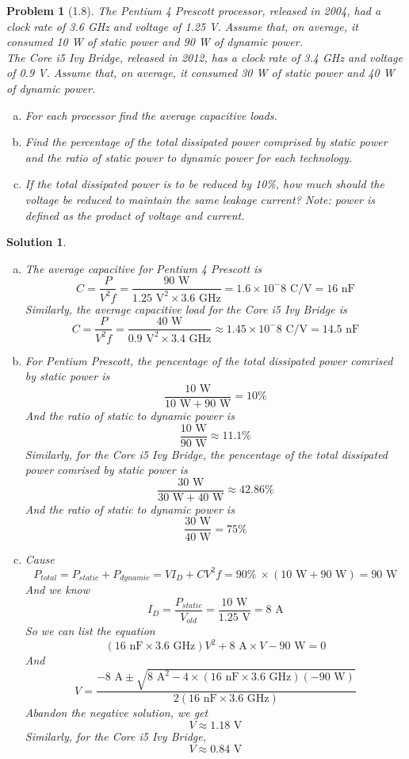\documentclass[12pt]{article}
\newtheorem{problem}{Problem}[]
\newtheorem*{solution}{Solution}
\begin{document}
    \begin{problem}[1.8]
      The Pentium 4 Prescott processor, released in 2004, had a clock rate of 3.6 GHz and voltage of 1.25 V. Assume that, on average, it consumed 10 W of static power and 90 W of dynamic power.\\
      The Core i5 Ivy Bridge, released in 2012, has a clock rate of 3.4 GHz and voltage of 0.9 V. Assume that, on average, it consumed 30 W of static power and 40 W of dynamic power.
      \begin{enumerate}[a.]
        \item For each processor find the average capacitive loads.
        \item Find the percentage of the total dissipated power comprised by static power and the ratio of static power to dynamic power for each technology.
        \item If the total dissipated power is to be reduced by 10\%, how much should the voltage be reduced to maintain the same leakage current? Note: power is defined as the product of voltage and current.
      \end{enumerate}
    \end{problem}

    \begin{solution}
      \begin{enumerate}[a.]
        \item The average capacitive for Pentium 4 Prescott is 
        \[C=\frac{P}{V^2f}=\frac{90\text{ W}}{1.25\text{ V}^2\times 3.6\text{ GHz}} = 1.6\times 10^-8\text{ C/V}=16\text{ nF}\]
        Similarly, the average capacitive load for the Core i5 Ivy Bridge is
        \[C=\frac{P}{V^2f}=\frac{40\text{ W}}{0.9\text{ V}^2\times 3.4\text{ GHz}}\approx 1.45\times 10^-8\text{ C/V}=14.5\text{ nF}\]
        \item For Pentium Prescott, the pencentage of the total dissipated power comrised by static power is
        \[\frac{10\text{ W}}{10\text{ W} + 90\text{ W}}=10\%\]
        And the ratio of static to dynamic power is
        \[\frac{10\text{ W}}{90\text{ W}}\approx 11.1\%\]
        Similarly, for the Core i5 Ivy Bridge, the pencentage of the total dissipated power comrised by static power is
        \[\frac{30\text{ W}}{30\text{ W} + 40\text{ W}}\approx 42.86\%\]
        And the ratio of static to dynamic power is
        \[\frac{30\text{ W}}{40\text{ W}} = 75\%\]
        \item Cause
        \[P_{total} = P_{static} + P_{dynamic} = VI_D+CV^2f=90\%\ \times (10\text{ W} + 90\text{ W}) = 90 \text{ W}\]
        And we know 
        \[I_D = \frac{P_{static}}{V_{old}} = \frac{10\text{ W}}{1.25\text{ V}} = 8 \text{ A}\]
        So we can list the equation
        \[(16\text{ nF}\times 3.6\text{ GHz})V^2 + 8\text{ A}\times V- 90\text{ W} = 0\]
        And
        \[V=\frac{-8\text{ A}\pm \sqrt{8\text{ A}^2-4\times (16\text{ nF}\times 3.6\text{ GHz})(-90\text{ W})}}{2(16\text{ nF}\times 3.6\text{ GHz})}\]
        Abandon the negative solution, we get
        \[V\approx 1.18\text{ V}\]
        Similarly, for the Core i5 Ivy Bridge,
        \[V\approx 0.84\text{ V}\]
      \end{enumerate}
    \end{solution}
\end{document}

